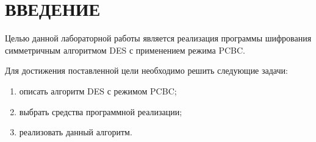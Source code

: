\chapter*{ВВЕДЕНИЕ}

Целью данной лабораторной работы является реализация программы шифрования симметричным алгоритмом DES с применением режима PCBC.

Для достижения поставленной цели необходимо решить следующие задачи:

\begin{enumerate}[label={\arabic*)}]
	\item описать алгоритм DES с режимом PCBC;
	\item выбрать средства программной реализации;
	\item реализовать данный алгоритм.
\end{enumerate}